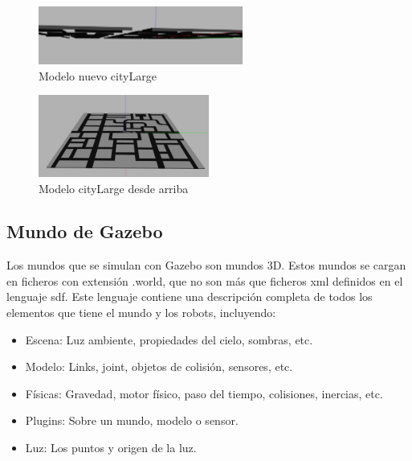 \begin{figure}[H]
  \begin{center}
    \includegraphics[width=0.6\textwidth]{figures/GPP/Mundo_sinPalo.png}
		\caption{Modelo nuevo cityLarge}
		\label{fig.mundo_sinpalo}
		\end{center}
\end{figure}

\begin{figure}[H]
  \begin{center}
    \includegraphics[width=0.5\textwidth]{figures/GPP/citiLarge_modelo.png}
		\caption{Modelo cityLarge desde arriba}
		\label{fig.citiLarge}
		\end{center}
\end{figure}

\subsection{Mundo de Gazebo}
Los mundos que se simulan con Gazebo son mundos 3D. Estos mundos se cargan en ficheros con extensión .world, que no son más que ficheros \acrshort{xml} definidos en el lenguaje \acrshort{sdf}. Este lenguaje contiene una descripción completa de todos los elementos que tiene el mundo y los robots, incluyendo:

\begin{itemize}
\item Escena: Luz ambiente, propiedades del cielo, sombras, etc.
\item Modelo: Links, joint, objetos de colisión, sensores, etc.
\item Físicas: Gravedad, motor físico, paso del tiempo, colisiones, inercias, etc.
\item Plugins: Sobre un mundo, modelo o sensor.
\item Luz: Los puntos y origen de la luz.
\end{itemize}

